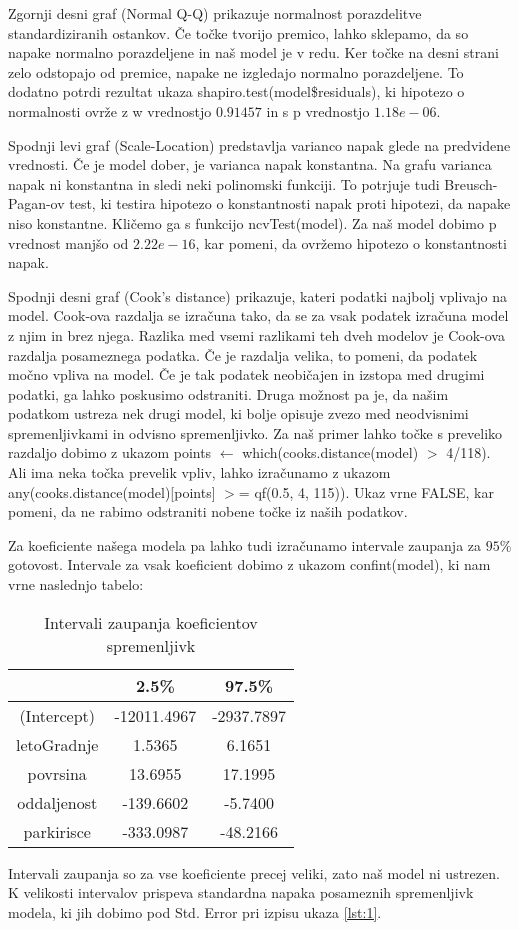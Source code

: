 \documentclass[a4paper, 12pt]{article}
\begin{document}
Zgornji desni graf (Normal Q-Q) prikazuje normalnost porazdelitve
standardiziranih ostankov. Če točke tvorijo premico, lahko sklepamo, da so
napake normalno porazdeljene in naš model je v redu. Ker točke na desni strani
zelo odstopajo od premice, napake ne izgledajo normalno porazdeljene. To
dodatno potrdi rezultat ukaza {\sf shapiro.test(model\$residuals)}, ki hipotezo
o normalnosti ovrže z w vrednostjo $ 0.91457 $ in s p vrednostjo $ 1.18e-06 $.

Spodnji levi graf (Scale-Location) predstavlja varianco napak glede na
predvidene vrednosti. Če je model dober, je varianca napak konstantna.
Na grafu varianca napak ni konstantna in sledi neki polinomski funkciji.
To potrjuje tudi Breusch-Pagan-ov test, ki testira hipotezo o konstantnosti
napak proti hipotezi, da napake niso konstantne. Kličemo ga s funkcijo
{\sf ncvTest(model)}. Za naš model dobimo p vrednost manjšo od $ 2.22e-16 $,
kar pomeni, da ovržemo hipotezo o konstantnosti napak.

Spodnji desni graf (Cook's distance) prikazuje, kateri podatki najbolj
vplivajo na model. Cook-ova razdalja se izračuna tako, da se za vsak podatek
izračuna model z njim in brez njega. Razlika med vsemi razlikami teh dveh
modelov je Cook-ova razdalja posameznega podatka. Če je razdalja velika,
to pomeni, da podatek močno vpliva na model. Če je tak podatek neobičajen in
izstopa med drugimi podatki, ga lahko poskusimo odstraniti. Druga možnost pa
je, da našim podatkom ustreza nek drugi model, ki bolje opisuje zvezo med
neodvisnimi spremenljivkami in odvisno spremenljivko. Za naš primer lahko točke
s preveliko razdaljo dobimo z ukazom {\sf points $\leftarrow$ which(cooks.distance(model) $ > $ 4/118)}.
Ali ima neka točka prevelik vpliv, lahko izračunamo z ukazom
{\sf any(cooks.distance(model)[points] $ > $= qf(0.5, 4, 115))}. Ukaz vrne FALSE,
kar pomeni, da ne rabimo odstraniti nobene točke iz naših podatkov.

Za koeficiente našega modela pa lahko tudi izračunamo intervale zaupanja za
$ 95\% $ gotovost. Intervale za vsak koeficient dobimo z ukazom {\sf confint(model)}, ki
nam vrne naslednjo tabelo:
\begin{table}[H]
\begin{center}
\caption{Intervali zaupanja koeficientov spremenljivk}
\begin{tabular}{ c|cc }
	& 2.5\% & 97.5\% \\
	\hline
	(Intercept) & -12011.4967 & -2937.7897 \\
	letoGradnje & 1.5365 & 6.1651 \\
	povrsina & 13.6955 & 17.1995 \\
	oddaljenost & -139.6602 & -5.7400 \\
	parkirisce & -333.0987 & -48.2166 \\
\end{tabular}
\end{center}
\end{table}
Intervali zaupanja so za vse koeficiente precej veliki, zato naš model ni
ustrezen. K velikosti intervalov prispeva standardna napaka posameznih
spremenljivk modela, ki jih dobimo pod {\sf Std. Error} pri izpisu ukaza
\ref{lst:1}.
\end{document}
